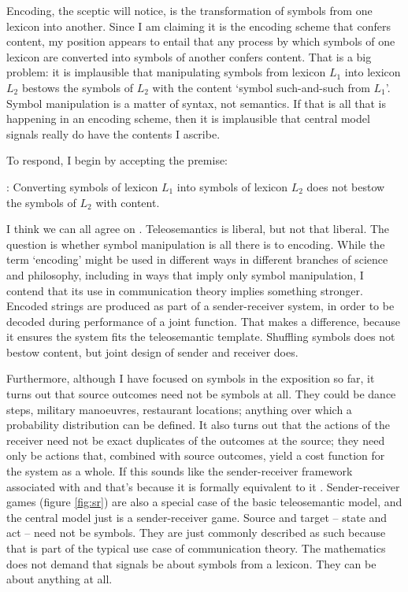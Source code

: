 \documentclass[12pt]{article}
\begin{document}
Encoding, the sceptic will notice, is the transformation of symbols from one lexicon into another.
Since I am claiming it is the encoding scheme that confers content, my position appears to entail that any process by which symbols of one lexicon are converted into symbols of another confers content.
That is a big problem: it is implausible that manipulating symbols from lexicon $L_1$ into lexicon $L_2$ bestows the symbols of $L_2$ with the content `symbol such-and-such from $L_1$'.
Symbol manipulation is a matter of syntax, not semantics.
If that is all that is happening in an encoding scheme, then it is implausible that central model signals really do have the contents I ascribe.

To respond, I begin by accepting the premise:

\begin{myquote}
\smi{}: Converting symbols of lexicon $L_1$ into symbols of lexicon $L_2$ does not bestow the symbols of $L_2$ with content.
\end{myquote}

\noindent I think we can all agree on \smi{}.
Teleosemantics is liberal, but not that liberal.
The question is whether symbol manipulation is all there is to encoding.
While the term `encoding' might be used in different ways in different branches of science and philosophy, including in ways that imply only symbol manipulation, I contend that its use in communication theory implies something stronger.
Encoded strings are produced as part of a sender-receiver system, in order to be decoded during performance of a joint function.
That makes a difference, because it ensures the system fits the teleosemantic template.
Shuffling symbols does not bestow content, but joint design of sender and receiver does.

Furthermore, although I have focused on symbols in the exposition so far, it turns out that source outcomes need not be symbols at all.
They could be dance steps, military manoeuvres, restaurant locations; anything over which a probability distribution can be defined.
It also turns out that the actions of the receiver need not be exact duplicates of the outcomes at the source; they need only be actions that, combined with source outcomes, yield a cost function for the system as a whole.
If this sounds like the sender-receiver framework associated with \citet{skyrms2010signals} and \citet{lewis1969convention} that's because it is formally equivalent to it \citep{martinez2019deception}.
Sender-receiver games (figure \ref{fig:sr}) are also a special case of the basic teleosemantic model, and the central model just is a sender-receiver game.
Source and target -- state and act -- need not be symbols.
They are just commonly described as such because that is part of the typical use case of communication theory.
The mathematics does not demand that signals be about symbols from a lexicon.
They can be about anything at all.
\end{document}
